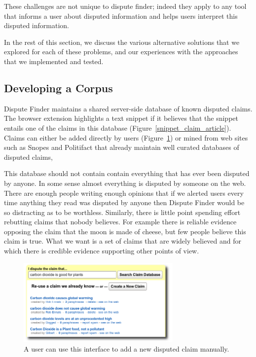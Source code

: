 \documentclass{www2010-submission}
\begin{document}
These challenges are not unique to dispute finder; indeed they apply to any tool that informs a user about disputed information and helps users interpret this disputed information.

In the rest of this section, we discuss the various alternative solutions that we explored for each of these problems, and our experiences with the approaches that we implemented and tested.


\subsection{Developing a Corpus}
\label{sec:disputed}

Dispute Finder maintains a shared server-side database of known disputed claims. The browser extension highlights a text snippet if it believes that the snippet entails one of the claims in this database (Figure~\ref{snippet_claim_article}). Claims can either be added directly by users (Figure~\ref{add_claim}) or mined from web sites such as Snopes and Politifact that already maintain well curated databases of disputed claims, 

This database should not contain contain everything that has ever been disputed by anyone. In some sense almost everything is disputed by someone on the web. There are enough people writing enough opinions that if we alerted users every time anything they read was disputed by anyone then Dispute Finder would be so distracting as to be worthless. Similarly, there is little point spending effort rebutting claims that nobody believes. For example there is reliable evidence opposing the claim that the moon is made of cheese, but few people believe this claim is true. What we want is a set of claims that are widely believed and for which there is credible evidence supporting other points of view.

\begin{figure}[tb]
	\begin{center}
	\includegraphics[width=8cm]{pictures/add_claim_list.png}
	\caption{A user can use this interface to add a new disputed claim manually.}
	\label{add_claim}
	\end{center}
\end{figure}
\end{document}

